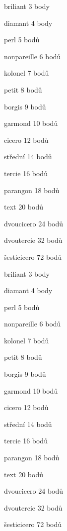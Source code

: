 \documentclass[a4paper]{article}
\begin{document}
{
\fontsize{3pt}{3pt}\selectfont briliant 3 body

\fontsize{4pt}{4pt}\selectfont diamant 4 body

\fontsize{5pt}{6pt}\selectfont perl 5 bodů

\fontsize{6pt}{7pt}\selectfont nonpareille 6 bodů

\fontsize{7pt}{8pt}\selectfont kolonel 7 bodů

\fontsize{8pt}{9pt}\selectfont petit 8 bodů

\fontsize{9pt}{10pt}\selectfont borgis 9 bodů

\fontsize{10pt}{12pt}\selectfont garmond 10 bodů

\fontsize{12pt}{14pt}\selectfont cicero 12 bodů

\fontsize{14pt}{16pt}\selectfont střední 14 bodů

\fontsize{16pt}{19pt}\selectfont tercie 16 bodů

\fontsize{18pt}{21pt}\selectfont parangon 18 bodů

\fontsize{20pt}{24pt}\selectfont text 20 bodů

\fontsize{24pt}{28pt}\selectfont dvoucicero 24 bodů

\fontsize{32pt}{38pt}\selectfont dvoutercie 32 bodů

\fontsize{72pt}{86pt}\selectfont šesticicero 72 bodů
}

{
\fontsize{3pt}{3pt}\selectfont briliant 3 body

\fontsize{4pt}{4pt}\selectfont diamant 4 body

\fontsize{5pt}{6pt}\selectfont perl 5 bodů

\fontsize{6pt}{7pt}\selectfont nonpareille 6 bodů

\fontsize{7pt}{8pt}\selectfont kolonel 7 bodů

\fontsize{8pt}{9pt}\selectfont petit 8 bodů

\fontsize{9pt}{10pt}\selectfont borgis 9 bodů

\fontsize{10pt}{12pt}\selectfont garmond 10 bodů

\fontsize{12pt}{14pt}\selectfont cicero 12 bodů

\fontsize{14pt}{16pt}\selectfont střední 14 bodů

\fontsize{16pt}{19pt}\selectfont tercie 16 bodů

\fontsize{18pt}{21pt}\selectfont parangon 18 bodů

\fontsize{20pt}{24pt}\selectfont text 20 bodů

\fontsize{24pt}{28pt}\selectfont dvoucicero 24 bodů

\fontsize{32pt}{38pt}\selectfont dvoutercie 32 bodů

\fontsize{72pt}{86pt}\selectfont šesticicero 72 bodů
}
\end{document}
